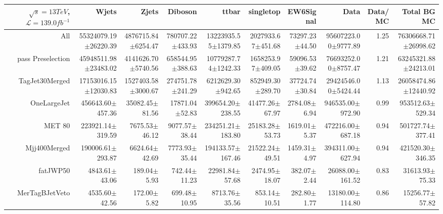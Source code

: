  \begin{tabular}{ r ||  r  r  r  r  r  r || r r r |} 
 \ensuremath{\sqrt{s}=13 TeV}, \ensuremath{\mathcal{L}=139.0 fb^{-1}}  & Wjets & Zjets & Diboson & ttbar & singletop & EW6Signal& Data & Data/MC & Total BG MC \tabularnewline 
 \hline 
All & 55324079.19$\pm$26220.39 & 4876715.84$\pm$6254.47 & 780707.22$\pm$433.93 & 13223935.55$\pm$1379.85 & 2027933.67$\pm$451.68 & 73297.23$\pm$44.50 & 95607223.00$\pm$9777.89 & 1.25 & 76306668.71$\pm$26998.62\tabularnewline \hline 
pass Preselection & 45948511.98$\pm$23483.02 & 4141626.70$\pm$5740.56 & 658544.95$\pm$388.63 & 10779287.74$\pm$1242.33 & 1658253.97$\pm$409.05 & 59096.53$\pm$39.62 & 76693252.00$\pm$8757.47 & 1.21 & 63245321.88$\pm$24213.01\tabularnewline \hline 
TagJet30Merged & 17153016.15$\pm$12030.83 & 1527403.58$\pm$3000.67 & 274751.78$\pm$241.29 & 6212629.30$\pm$942.65 & 852949.30$\pm$289.70 & 37724.74$\pm$30.84 & 29424546.00$\pm$5424.44 & 1.13 & 26058474.86$\pm$12440.92\tabularnewline \hline 
OneLargeJet & 456643.60$\pm$457.36 & 35082.45$\pm$81.56 & 17871.04$\pm$52.83 & 399654.20$\pm$238.55 & 41477.26$\pm$67.97 & 2784.08$\pm$6.94 & 946535.00$\pm$972.90 & 0.99 & 953512.63$\pm$529.34\tabularnewline \hline 
MET 80 & 223921.14$\pm$319.59 & 7675.53$\pm$46.12 & 9077.57$\pm$38.44 & 234251.21$\pm$183.80 & 25183.28$\pm$53.73 & 1619.01$\pm$5.37 & 472216.00$\pm$687.18 & 0.94 & 501727.74$\pm$377.41\tabularnewline \hline 
Mjj400Merged & 190006.61$\pm$293.87 & 6624.64$\pm$42.69 & 7773.93$\pm$35.44 & 194133.57$\pm$167.46 & 21522.24$\pm$49.51 & 1459.31$\pm$4.97 & 394311.00$\pm$627.94 & 0.94 & 421520.30$\pm$346.35\tabularnewline \hline 
fatJWP50 & 4843.61$\pm$43.06 & 189.04$\pm$5.93 & 742.44$\pm$11.23 & 22981.84$\pm$57.68 & 2474.95$\pm$18.07 & 382.07$\pm$2.44 & 26088.00$\pm$161.52 & 0.83 & 31613.93$\pm$75.33\tabularnewline \hline 
MerTagBJetVeto & 4535.60$\pm$42.56 & 172.00$\pm$5.82 & 699.48$\pm$10.95 & 8713.76$\pm$35.56 & 853.14$\pm$10.51 & 282.80$\pm$1.77 & 13180.00$\pm$114.80 & 0.86 & 15256.77$\pm$57.82\tabularnewline \hline 
\end{tabular}
